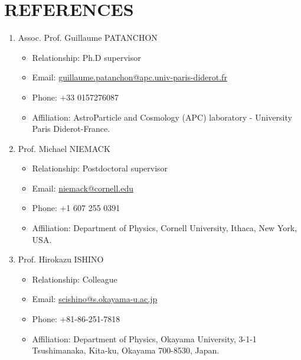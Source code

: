 \documentclass[paper=a4,fontsize=11pt]{scrartcl} %
\newcommand{\sepspace}{\vspace*{1em}}		%
\newcommand{\NewPart}[1]{\section*{\uppercase{#1}}}
\begin{document}
\NewPart{References}{}
\sepspace
\begin{enumerate}
    \item Assoc. Prof. Guillaume PATANCHON
            \begin{itemize}
                \item Relationship: Ph.D supervisor
                \item Email: \href{mailto:guillaume.patanchon@apc.univ-paris-diderot.fr}{\color{blue} guillaume.patanchon@apc.univ-paris-diderot.fr}
                \item Phone: +33 0157276087
                \item Affiliation: AstroParticle and Cosmology (APC) laboratory - University Paris Diderot-France.
            \end{itemize}
    
    \item Prof. Michael NIEMACK
        \begin{itemize}
                \item Relationship: Postdoctoral supervisor
                \item Email: \href{mailto:niemack@cornell.edu}{\color{blue} niemack@cornell.edu}
                \item Phone: +1 607 255 0391
                \item Affiliation: Department of Physics, Cornell University, Ithaca, New York, USA.
            \end{itemize}
    \item Prof. Hirokazu ISHINO
            \begin{itemize}
                \item Relationship: Colleague
                \item Email:  \href{mailto:scishino@s.okayama-u.ac.jp}{\color{blue} scishino@s.okayama-u.ac.jp}
                \item Phone: +81-86-251-7818
                \item Affiliation: Department of Physics, Okayama University, 3-1-1 Tsushimanaka, Kita-ku, Okayama 700-8530, Japan.
            \end{itemize}
\end{enumerate}
\end{document}
